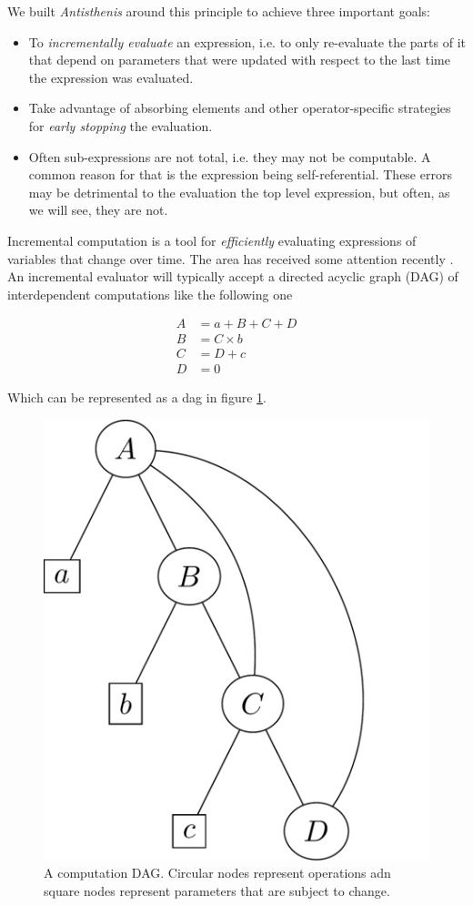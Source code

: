 We built \emph{Antisthenis} around this principle to achieve three
important goals:

\begin{itemize}
\item To \emph{incrementally evaluate} an expression, i.e. to only
  re-evaluate the parts of it that depend on parameters that were
  updated with respect to the last time the expression was evaluated.
\item Take advantage of absorbing elements and other operator-specific
  strategies for \emph{early stopping} the evaluation.
\item Often sub-expressions are not total, i.e. they may not be
  computable. A common reason for that is the expression being
  self-referential. These errors may be detrimental to the evaluation
  the top level expression, but often, as we will see, they are not.
\end{itemize}

Incremental computation is a tool for \emph{efficiently} evaluating
expressions of variables that change over time. The area has received
some attention recently
\cite{bhatotiaIncoopMapReduceIncremental2011,hammerAdaptonComposableDemanddriven2014a}. An
incremental evaluator will typically accept a directed acyclic graph
(DAG) of interdependent computations like the following one

\begin{align*}
A &= a + B + C + D  \\
B &= C \times b \\
C & = D + c \\
D &= 0
\end{align*}

Which can be represented as a dag in figure
\ref{fig:example_antisthenis_dag}.

\begin{figure}[H]
\centering
\includegraphics[width=.5\textwidth]{./imgs/example_antisthenis_dag.pdf}
\caption{\label{fig:example_antisthenis_dag}A computation
  DAG. Circular nodes represent operations adn square nodes represent
  parameters that are subject to change.}
\end{figure}

